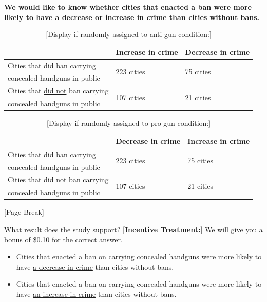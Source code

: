 \medskip
\textbf{We would like to know whether cities that enacted a ban were more likely to have a \underline{decrease} or \underline{increase} in crime than cities without bans.}

\begin{table}[h]
\centering
\caption*{{[}Display if randomly assigned to anti-gun condition:{]}} \label{tab:siantigun_corrected}
\begin{tabular}{|l|l|l|}
\hline 
  & Increase in crime  & Decrease in crime \\\hline
  Cities that \underline{did} ban carrying     & \multirow{2}{*}{223 cities} & \multirow{2}{*}{75 cities} \\ 
  concealed handguns in public           &               & \\ \hline
  Cities that \underline{did not} ban carrying & \multirow{2}{*}{107 cities} & \multirow{2}{*}{21 cities} \\ 
  concealed handguns in public           &               &  \\\hline
\end{tabular}
\end{table}

\vspace{-5mm}
\begin{table}[h]
\centering
\caption*{{[}Display if randomly assigned to pro-gun condition:{]}} \label{tab:siprogun_corrected}
\begin{tabular}{|l|l|l|}
\hline 
  & Decrease in crime & Increase in crime \\\hline
  Cities that \underline{did} ban carrying     & \multirow{2}{*}{223 cities} & \multirow{2}{*}{75 cities} \\ 
  concealed handguns in public           &               & \\ \hline
  Cities that \underline{did not} ban carrying & \multirow{2}{*}{107 cities} & \multirow{2}{*}{21 cities} \\ 
  concealed handguns in public           &               &  \\\hline
\end{tabular}
\end{table}

\vspace{-5mm}
\begin{center}
 {[}Page Break{]}
\end{center}

What result does the study support? {[}\textbf{Incentive Treatment:}{]} We will give you a bonus of \$0.10 for the correct answer.
\begin{itemize}
  \item Cities that enacted a ban on carrying concealed handguns were more likely to have \uline{a decrease in crime} than cities without bans.
  \item Cities that enacted a ban on carrying concealed handguns were more likely to have \uline{an increase in crime} than cities without bans.
\end{itemize}

